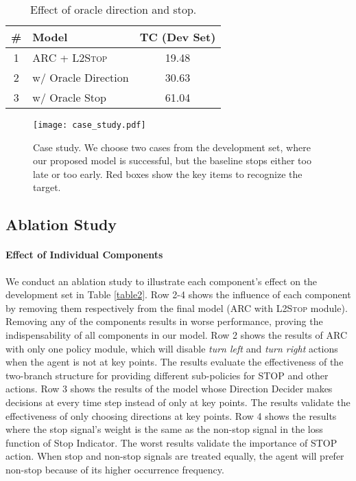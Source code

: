 \documentclass[11pt,a4paper]{article}
\begin{document}
\begin{table}[t]
\small
  \centering
  \begin{tabular}{clc}
    \toprule
    \#&Model&TC (Dev Set)\\
    \midrule
    1&ARC + \textsc{L2Stop}&19.48\\
    2&\quad w/ Oracle Direction &30.63\\
    3&\quad w/ Oracle Stop&61.04\\
    \bottomrule
  \end{tabular}
  \caption{Effect of oracle direction and stop.}
  \label{table:branch}
\end{table}

\begin{figure*}[t]
\begin{center}
   \texttt{[image: case\_study.pdf]}
\end{center}
   \caption{Case study. We choose two cases from the development set, where our proposed model is successful, but the baseline stops either too late or too early. Red boxes show the key items to recognize the target.}
\label{case_study}
\end{figure*}

\subsection{Ablation Study}
\paragraph{Effect of Individual Components}
We conduct an ablation study to illustrate each component's effect on the development set in Table \ref{table2}. 
Row 2-4 shows the influence of each component by removing them respectively from the final model (ARC with \textsc{L2Stop} module). 
Removing any of the components results in worse performance, proving the indispensability of all components in our model.
Row 2 shows the results of ARC with only one policy module, which will disable \emph{turn left} and \emph{ turn right} actions when the agent is not at key points. The results evaluate the effectiveness of the two-branch structure for providing different sub-policies for STOP and other actions. 
Row 3 shows the results of the model whose Direction Decider makes decisions at every time step instead of only at key points. The results validate the effectiveness of only choosing directions at key points. 
Row 4 shows the results where the stop signal's weight is the same as the non-stop signal in the loss function of Stop Indicator. The worst results validate the importance of STOP action. When stop and non-stop signals are treated equally, the agent will prefer non-stop because of its higher occurrence frequency.
\end{document}
